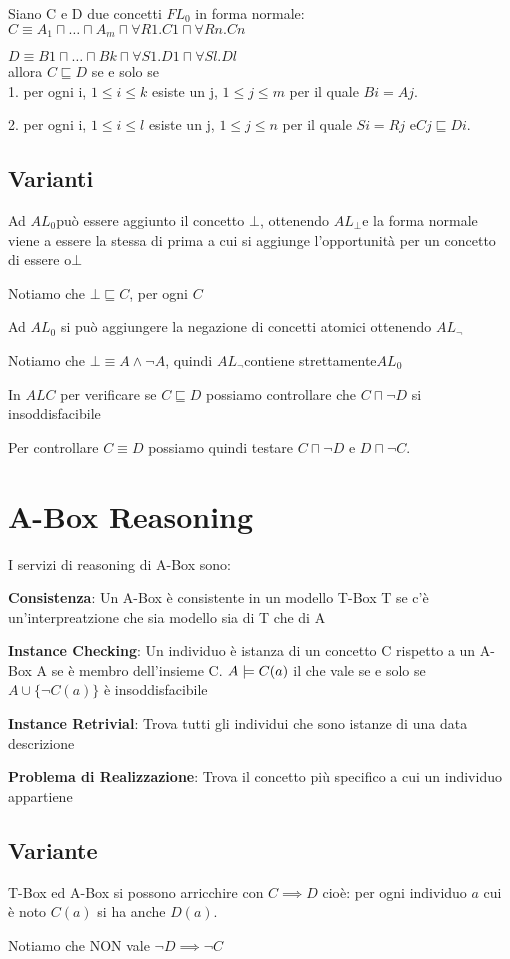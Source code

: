 	

Siano C e D due concetti $FL_{0}$ in forma normale: \\


$C\equiv A_{1}\sqcap\dots\sqcap A_{m}\sqcap\forall R1.C1\sqcap\forall Rn.Cn$

$D\equiv B1\sqcap\dots\sqcap Bk\sqcap\forall S1.D1\sqcap\forall Sl.Dl$	\\


allora $C\sqsubseteq D$ se e solo se \\


1. per ogni i, $1\leq i\leq k$ esiste un j, $1\leq j\leq m$ per
il quale $Bi=Aj$.

2. per ogni i, $1\leq i\leq l$ esiste un j, $1\leq j\leq n$ per
il quale $Si=Rj$ e$Cj\sqsubseteq Di$.


\subsection{Varianti}

Ad $AL_{0}$può essere aggiunto il concetto $\bot$, ottenendo $AL_{\bot}$e
la forma normale viene a essere la stessa di prima a cui si aggiunge
l'opportunità per un concetto di essere o$\bot$

Notiamo che $\bot\sqsubseteq C$, per ogni $C$

Ad $AL_{0}$ si può aggiungere la negazione di concetti atomici ottenendo
$AL_{\neg}$

Notiamo che $\bot\equiv A\wedge\neg A$, quindi $AL_{\neg}$contiene
strettamente$AL_{0}$	

In $ALC$ per verificare se $C\sqsubseteq D$ possiamo controllare
che $C\sqcap\neg D$ si insoddisfacibile

Per controllare $C\equiv D$ possiamo quindi testare $C\sqcap\neg D$
e $D\sqcap\neg C$.


\section{A-Box Reasoning}

	I servizi di reasoning di A-Box sono:

\textbf{Consistenza}: Un A-Box è consistente in un modello T-Box T
se c'è un'interpreatzione che sia modello sia di T che di A

\textbf{Instance Checking}: Un individuo è istanza di un concetto
C rispetto a un A-Box A se è membro dell'insieme C. $A\models C(a)$
il che vale se e solo se $A\cup\{\neg C(a)\}$ è insoddisfacibile

\textbf{Instance Retrivial}: Trova tutti gli individui che sono istanze
di una data descrizione

\textbf{Problema di Realizzazione}: Trova il concetto più specifico
a cui un individuo appartiene


\subsection{Variante}

T-Box ed A-Box si possono arricchire con $C\implies D$ cioè: per
ogni individuo $a$ cui è noto $C(a)$ si ha anche $D(a)$.

Notiamo che NON vale $\neg D\implies\neg C$

		
